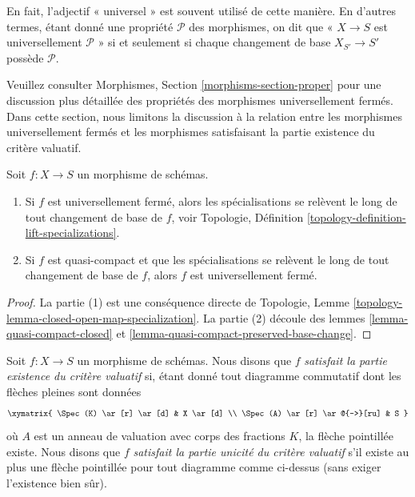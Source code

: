 \noindent
En fait, l’adjectif « universel » est souvent utilisé de cette manière. En
d’autres termes, étant donné une propriété  $\mathcal{P}$  des morphismes, on dit que
« $X \to S$  est universellement  $\mathcal{P}$ » si et seulement si chaque
changement de base  $X_{S'} \to S'$  possède  $\mathcal{P}$.

\medskip\noindent
Veuillez consulter Morphismes, Section  \ref{morphisms-section-proper}  pour une discussion plus
détaillée des propriétés des morphismes universellement fermés. Dans cette
section, nous limitons la discussion à la relation entre les morphismes
universellement fermés et les morphismes satisfaisant la partie existence du
critère valuatif.

\begin{lemma}
\label{lemma-specializations-lift}
Soit  $f : X \to S$  un morphisme de schémas.
\begin{enumerate}
\item Si  $f$  est universellement fermé, alors les spécialisations se relèvent
le long de tout changement de base de  $f$, voir Topologie, Définition
 \ref{topology-definition-lift-specializations}.
\item Si  $f$  est quasi-compact et que les spécialisations se relèvent le long
de tout changement de base de  $f$, alors  $f$  est universellement
fermé.
\end{enumerate}
\end{lemma}

\begin{proof}
La partie (1) est une conséquence directe de Topologie, Lemme  \ref{topology-lemma-closed-open-map-specialization}. La
partie (2) découle des lemmes  \ref{lemma-quasi-compact-closed}  et  \ref{lemma-quasi-compact-preserved-base-change}.
\end{proof}

\begin{definition}
\label{definition-valuative-criterion}
Soit  $f : X \to S$  un morphisme de schémas. Nous disons que  $f$ 
 {\it  satisfait la partie existence du critère
valuatif}  si, étant donné tout diagramme commutatif dont les flèches pleines sont données
$$
\xymatrix{
\Spec(K) \ar[r] \ar[d] & X \ar[d] \\
\Spec(A) \ar[r] \ar@{-->}[ru] & S
}
$$
où  $A$  est un anneau de valuation avec corps des fractions  $K$,
la flèche pointillée existe. Nous disons que  $f$   {\it 
satisfait la partie unicité du critère valuatif}  s'il existe au plus
une flèche pointillée pour tout diagramme comme ci-dessus (sans exiger l'existence
bien sûr).
\end{definition}

